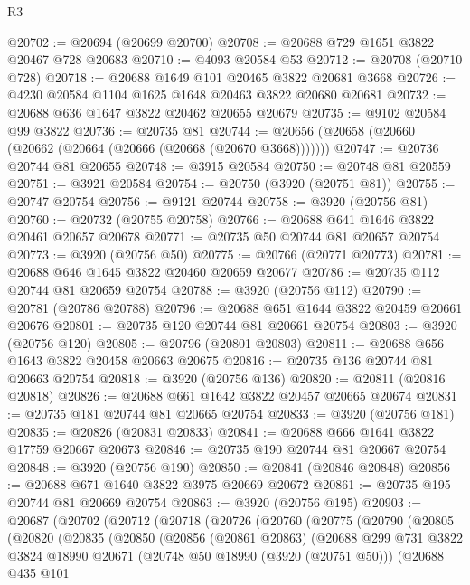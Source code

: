 \begin{lexlean}{R3}
\begin{coremodule}
@20702 := @20694 (@20699 @20700)
@20708 := @20688 @729 @1651 @3822 @20467 @728 @20683
@20710 := @4093 @20584 @53
@20712 := @20708 (@20710 @728)
@20718 := @20688 @1649 @101 @20465 @3822 @20681 @3668
@20726 := @4230 @20584 @1104 @1625 @1648 @20463 @3822 @20680 @20681
@20732 := @20688 @636 @1647 @3822 @20462 @20655 @20679
@20735 := @9102 @20584 @99 @3822
@20736 := @20735 @81
@20744 := @20656 (@20658 (@20660 (@20662 (@20664 (@20666 (@20668 (@20670 @3668)))))))
@20747 := @20736 @20744 @81 @20655
@20748 := @3915 @20584
@20750 := @20748 @81 @20559
@20751 := @3921 @20584
@20754 := @20750 (@3920 (@20751 @81))
@20755 := @20747 @20754
@20756 := @9121 @20744
@20758 := @3920 (@20756 @81)
@20760 := @20732 (@20755 @20758)
@20766 := @20688 @641 @1646 @3822 @20461 @20657 @20678
@20771 := @20735 @50 @20744 @81 @20657 @20754
@20773 := @3920 (@20756 @50)
@20775 := @20766 (@20771 @20773)
@20781 := @20688 @646 @1645 @3822 @20460 @20659 @20677
@20786 := @20735 @112 @20744 @81 @20659 @20754
@20788 := @3920 (@20756 @112)
@20790 := @20781 (@20786 @20788)
@20796 := @20688 @651 @1644 @3822 @20459 @20661 @20676
@20801 := @20735 @120 @20744 @81 @20661 @20754
@20803 := @3920 (@20756 @120)
@20805 := @20796 (@20801 @20803)
@20811 := @20688 @656 @1643 @3822 @20458 @20663 @20675
@20816 := @20735 @136 @20744 @81 @20663 @20754
@20818 := @3920 (@20756 @136)
@20820 := @20811 (@20816 @20818)
@20826 := @20688 @661 @1642 @3822 @20457 @20665 @20674
@20831 := @20735 @181 @20744 @81 @20665 @20754
@20833 := @3920 (@20756 @181)
@20835 := @20826 (@20831 @20833)
@20841 := @20688 @666 @1641 @3822 @17759 @20667 @20673
@20846 := @20735 @190 @20744 @81 @20667 @20754
@20848 := @3920 (@20756 @190)
@20850 := @20841 (@20846 @20848)
@20856 := @20688 @671 @1640 @3822 @3975 @20669 @20672
@20861 := @20735 @195 @20744 @81 @20669 @20754
@20863 := @3920 (@20756 @195)
@20903 := @20687
    (@20702
      (@20712
        (@20718
          (@20726
            (@20760
              (@20775
                (@20790
                  (@20805
                    (@20820
                      (@20835
                        (@20850
                          (@20856
                            (@20861 @20863)
                            (@20688
                              @299
                              @731
                              @3822
                              @3824
                              @18990
                              @20671
                              (@20748 @50 @18990 (@3920 (@20751 @50)))
                              (@20688
                                @435
                                @101

\end{coremodule}
\end{lexlean}
